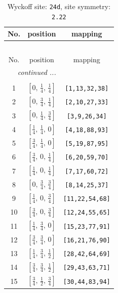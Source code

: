 \documentclass[fleqn,8pt]{jsarticle}
\begin{document}
\begin{longtable}{ccc}
\caption{Wyckoff site: {\tt 24d}, site symmetry: {\tt 2.22}}
 \\
 \hline \hline
No. & position & mapping \\ \hline \endfirsthead

\multicolumn{2}{l}{\tablename\ \thetable{}} \\
 \hline \hline
No. & position & mapping \\ \hline \endhead

 \hline \hline
\multicolumn{2}{r}{\footnotesize\it continued ...} \\ \endfoot

 \hline \hline
\multicolumn{2}{r}{} \\ \endlastfoot

1 & $\left[ 0,\, \frac{1}{4},\, \frac{1}{4} \right]$ & {\tt [1,13,32,38]} \\ \hline
2 & $\left[ 0,\, \frac{3}{4},\, \frac{1}{4} \right]$ & {\tt [2,10,27,33]} \\ \hline
3 & $\left[ 0,\, \frac{1}{4},\, \frac{3}{4} \right]$ & {\tt [3,9,26,34]} \\ \hline
4 & $\left[ \frac{1}{4},\, \frac{1}{4},\, 0 \right]$ & {\tt [4,18,88,93]} \\ \hline
5 & $\left[ \frac{3}{4},\, \frac{1}{4},\, 0 \right]$ & {\tt [5,19,87,95]} \\ \hline
6 & $\left[ \frac{3}{4},\, 0,\, \frac{1}{4} \right]$ & {\tt [6,20,59,70]} \\ \hline
7 & $\left[ \frac{1}{4},\, 0,\, \frac{1}{4} \right]$ & {\tt [7,17,60,72]} \\ \hline
8 & $\left[ 0,\, \frac{3}{4},\, \frac{3}{4} \right]$ & {\tt [8,14,25,37]} \\ \hline
9 & $\left[ \frac{1}{4},\, 0,\, \frac{3}{4} \right]$ & {\tt [11,22,54,68]} \\ \hline
10 & $\left[ \frac{3}{4},\, 0,\, \frac{3}{4} \right]$ & {\tt [12,24,55,65]} \\ \hline
11 & $\left[ \frac{1}{4},\, \frac{3}{4},\, 0 \right]$ & {\tt [15,23,77,91]} \\ \hline
12 & $\left[ \frac{3}{4},\, \frac{3}{4},\, 0 \right]$ & {\tt [16,21,76,90]} \\ \hline
13 & $\left[ \frac{1}{4},\, \frac{3}{4},\, \frac{1}{2} \right]$ & {\tt [28,42,64,69]} \\ \hline
14 & $\left[ \frac{3}{4},\, \frac{3}{4},\, \frac{1}{2} \right]$ & {\tt [29,43,63,71]} \\ \hline
15 & $\left[ \frac{3}{4},\, \frac{1}{2},\, \frac{3}{4} \right]$ & {\tt [30,44,83,94]} \\ \hline

\end{longtable}
\end{document}

